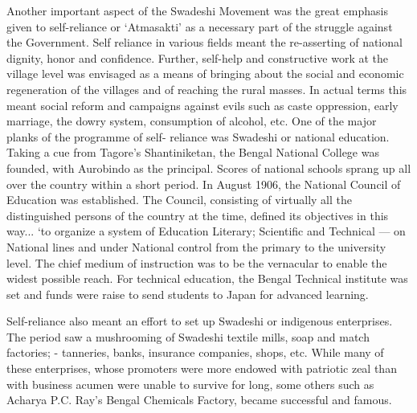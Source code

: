 Another important aspect of the Swadeshi Movement was the great emphasis given to self-reliance or `Atmasakti' as a necessary part of the struggle against the Government. Self reliance in various fields meant the re-asserting of national dignity, honor and confidence. Further, self-help and constructive work at the village level was envisaged as a means of bringing about the social and economic regeneration of the villages and of reaching the rural masses. In actual terms this meant social reform and campaigns against evils such as caste oppression, early marriage, the dowry system, consumption of alcohol, etc. One of the major planks of the programme of self- reliance was Swadeshi or national education. Taking a cue from Tagore's Shantiniketan, the Bengal National College was founded, with Aurobindo as the principal. Scores of national schools sprang up all over the country within a short period. In August 1906, the National Council of Education was established. The Council, consisting of virtually all the distinguished persons of the country at the time, defined its objectives in this way... `to organize a system of Education Literary; Scientific and Technical --- on National lines and under National control from the primary to the university level. The chief medium of instruction was to be the vernacular to enable the widest possible reach. For technical education, the Bengal Technical institute was set and funds were raise to send students to Japan for advanced learning.

Self-reliance also meant an effort to set up Swadeshi or indigenous enterprises. The period saw a mushrooming of Swadeshi textile mills, soap and match factories; - tanneries, banks, insurance companies, shops, etc. While many of these enterprises, whose promoters were more endowed with patriotic zeal than with business acumen were unable to survive for long, some others such as Acharya P.C. Ray's Bengal Chemicals Factory, became successful and famous.

